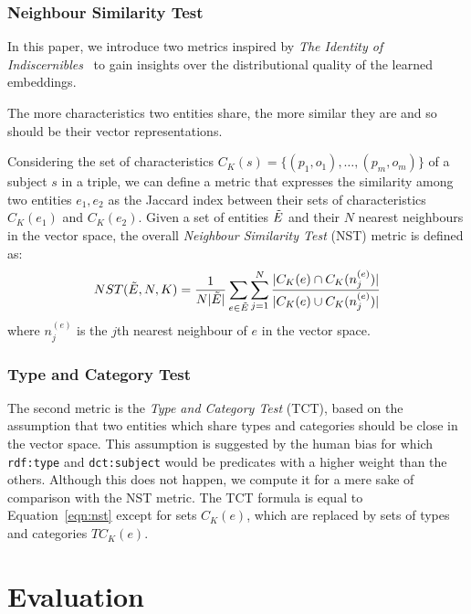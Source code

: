 \documentclass[graybox]{archivesofdatascience}
\begin{document}
\subsubsection{Neighbour Similarity Test}

In this paper, we introduce two metrics inspired by \textit{The Identity of Indiscernibles}~\citep{black1952identity} to gain insights over the distributional quality of the learned embeddings.
\begin{svgraybox}
The more characteristics two entities share, the more similar they are and so should be their vector representations.
\end{svgraybox}
Considering the set of characteristics $C_K(s)=\{(p_1,o_1),\dots,(p_m,o_m)\}$ of a subject $s$ in a triple, we can define a metric that expresses the similarity among two entities $e_1,e_2$ as the Jaccard index between their sets of characteristics $C_K(e_1)$ and $C_K(e_2)$.
Given a set of entities $\Tilde{E}$ and their $N$ nearest neighbours in the vector space, the overall \textit{Neighbour Similarity Test} (NST) metric is defined as:
\begin{equation} \label{eqn:nst}
    NST(\Tilde{E},N,K) = \frac{1}{N \vert \Tilde{E} \vert} \sum_{e \in \Tilde{E}} \sum_{j=1}^N \frac{\vert C_K(e) \cap C_K(n_j^{(e)}) \vert}{\vert C_K(e) \cup C_K(n_j^{(e)}) \vert}
\end{equation}
where $n_j^{(e)}$ is the $j$th nearest neighbour of $e$ in the vector space.

\subsubsection{Type and Category Test}

The second metric is the \textit{Type and Category Test} (TCT), based on the assumption that two entities which share types and categories should be close in the vector space.
This assumption is suggested by the human bias for which \texttt{rdf:type} and \texttt{dct:subject} would be predicates with a higher weight than the others.
Although this does not happen, we compute it for a mere sake of comparison with the NST metric.
The TCT formula is equal to Equation~\ref{eqn:nst} except for sets $C_K(e)$, which are replaced by sets of types and categories $TC_K(e)$.

\section{Evaluation} \label{sec:eval}
\end{document}
